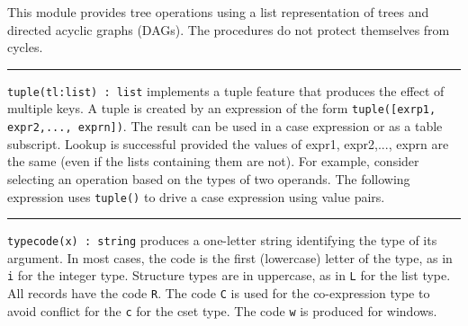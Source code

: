 This module provides tree operations using a list representation of
trees and directed acyclic graphs (DAGs). The procedures do not
protect themselves from cycles. 

\vspace{0.25cm}\hrule{}

\texttt{tuple(tl:list) : list} implements a
{\textquotedbl}tuple{\textquotedbl} feature that produces the effect of
multiple keys. A tuple is created by an expression of the form
\texttt{tuple([exrp1, expr2,..., exprn])}. The result can be used in a
case expression or as a table subscript. Lookup
is successful provided the values of expr1, expr2,..., exprn are the
same (even if the lists containing them are not). For example, consider
selecting an operation based on the types of two operands. The
following expression uses \texttt{tuple()} to drive a case expression
using value pairs.


\vspace{0.25cm}\hrule{}

\texttt{typecode(x) : string} produces a one-letter string identifying
the type of its argument. In most cases, the code is the first
(lowercase) letter of the type, as in
\texttt{{\textquotedbl}i{\textquotedbl}} for the integer type.
Structure types are in uppercase, as in
\texttt{{\textquotedbl}L{\textquotedbl}} for the list type. All records
have the code \texttt{{\textquotedbl}R{\textquotedbl}}. The code
\texttt{{\textquotedbl}C{\textquotedbl}} is used for the co-expression
type to avoid conflict for the \texttt{{\textquotedbl}c{\textquotedbl}}
for the cset type. The code \texttt{{\textquotedbl}w{\textquotedbl}} is
produced for windows. 

